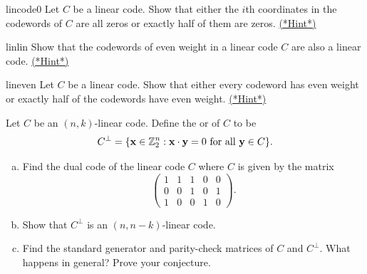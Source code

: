 \begin{exercise}{lincode0}  
Let $C$ be a linear code. Show that either the $i$th coordinates in the
codewords of $C$ are all zeros or exactly half of them are zeros. \hyperref[sec:algcodes:hints]{(*Hint*)}
\end{exercise} 

\begin{exercise}{linlin}
Show that the codewords of even weight in a linear code $C$ are also a
linear code.  \hyperref[sec:algcodes:hints]{(*Hint*)}
\end{exercise}	 


\begin{exercise}{lineven}
Let $C$ be a linear code. Show that either every codeword has even
weight or exactly half of the codewords have even weight.  \hyperref[sec:algcodes:hints]{(*Hint*)}
\end{exercise} 
 
 
\begin{exercise}{}
Let $C$ be an $(n,k)$-linear code. Define the  or  of $C$  to be 
\[
C^\perp = \{ {\bold x} \in \mathbb{Z}_2^n :  {\bold x} \cdot {\bold y} =
0 \mbox{ for all } {\bold y} \in C \}. 
\]

\begin{enumerate}[(a)]
\item
Find the dual code of the linear code $C$ where $C$ is given by the
matrix 
\[
\left(
\begin{array}{ccccc}
1 & 1 & 1 & 0 & 0 \\
0 & 0 & 1 & 0 & 1 \\
1 & 0 & 0 & 1 & 0
\end{array}
\right).
\]
 
\item
Show that $C^\perp$ is an $(n, n-k)$-linear code.
 
\item
Find the standard generator and parity-check matrices of $C$ and
$C^\perp$. What happens in general? Prove your conjecture. 
\end{enumerate}

 \end{exercise}
 
